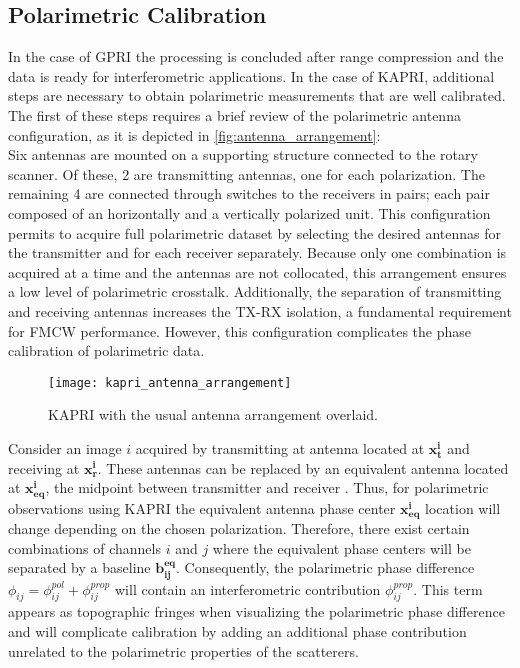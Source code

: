 \subsection{Polarimetric Calibration}\label{sec:proc_polcal}
In the case of GPRI the processing is concluded after range compression and the data is ready for interferometric applications. In the case of  KAPRI, additional steps are necessary to obtain polarimetric measurements that are well calibrated.\\ The first of these steps requires a brief review of the polarimetric antenna configuration, as it is depicted in \autoref{fig:antenna_arrangement}:\\ Six antennas are mounted on a supporting structure connected to the rotary scanner. Of these, 2 are transmitting antennas, one for each polarization. The remaining 4 are connected through switches to the receivers in pairs; each pair composed of an horizontally and a vertically polarized unit. This configuration permits to acquire full polarimetric dataset by selecting the desired antennas for the transmitter and for each receiver separately. Because only one combination is acquired at a time and the antennas are not collocated, this arrangement ensures a low level of polarimetric crosstalk. Additionally, the separation of transmitting and receiving antennas increases the TX-RX isolation, a fundamental requirement for FMCW performance\cite{Beasley1990,Stove1992, Strozzi2011}.  However, this configuration complicates the phase calibration of polarimetric data.
\begin{figure}[ht]
	\centering
	\texttt{[image: kapri\_antenna\_arrangement]}
	\caption{KAPRI with the usual antenna arrangement overlaid. }
	\label{fig:antenna_arrangement}
\end{figure}
Consider an image $i$ acquired by transmitting at antenna located at $\mathbf{x_t^i}$ and receiving at $\mathbf{x_r^i}$. These antennas can be replaced by an equivalent antenna located at $\mathbf{x_{eq}^i}$, the midpoint between transmitter and receiver \cite{Pipia2009}. Thus, for polarimetric observations using  KAPRI the equivalent antenna phase center $\mathbf{x_{eq}^i}$ location will change depending on the chosen polarization. Therefore, there exist certain combinations of channels $i$ and $j$ where the equivalent phase centers will be separated by a baseline $\mathbf{b_{ij}^{eq}}$. Consequently, the polarimetric phase difference $\phi_{ij} = \phi_{ij}^{pol} + \phi_{ij}^{prop}$  will contain an interferometric contribution $\phi_{ij}^{prop}$. This term appears as topographic fringes when visualizing the polarimetric phase difference and will complicate calibration by adding an additional phase contribution unrelated to the polarimetric properties of the scatterers.\\
